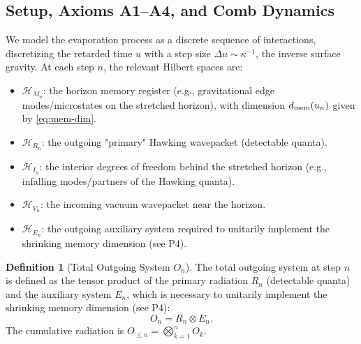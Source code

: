 \documentclass[a4paper,11pt]{article}
\newcommand{\eg}{e.g.\xspace}
\theoremstyle{plain}
\theoremstyle{definition}
\newtheorem{definition}{Definition}
\theoremstyle{remark}
\begin{document}
\subsection{Setup, Axioms A1--A4, and Comb Dynamics}
\label{sec:setup}
\label{sec:formalism}
We model the evaporation process as a discrete sequence of interactions, discretizing the retarded time $u$ with a step size $\Delta u \sim \kappa^{-1}$, the inverse surface gravity. At each step $n$, the relevant Hilbert spaces are:
\begin{itemize}
    \item $\mathcal{H}_{M_n}$: the horizon memory register (\eg, gravitational edge modes/microstates on the stretched horizon), with dimension $d_{\rm mem}(u_n)$ given by \eqref{eq:mem-dim}.
    \item $\mathcal{H}_{R_n}$: the outgoing "primary" Hawking wavepacket (detectable quanta).
    \item $\mathcal{H}_{I_n}$: the interior degrees of freedom behind the stretched horizon (\eg, infalling modes/partners of the Hawking quanta).
    \item $\mathcal{H}_{V_n}$: the incoming vacuum wavepacket near the horizon.
    \item $\mathcal{H}_{E_n}$: the outgoing auxiliary system required to unitarily implement the shrinking memory dimension (see P4).
\end{itemize}

\begin{definition}[Total Outgoing System $O_n$]
The total outgoing system at step $n$ is defined as the tensor product of the primary radiation $R_n$ (detectable quanta) and the auxiliary system $E_n$, which is necessary to unitarily implement the shrinking memory dimension (see P4):
\begin{equation}
    O_n = R_n \otimes E_n.
\end{equation}
The cumulative radiation is $O_{\le n}=\bigotimes_{k=1}^n O_k$.
\end{definition}
\end{document}
